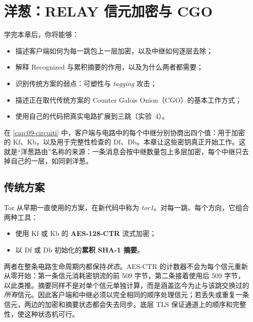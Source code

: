 \chapter{洋葱：RELAY 信元加密与 CGO}\label{cap:10-cifratura-relay}

\begin{obiettivi}
学完本章后，你将能够：
\begin{itemize}[nosep]
  \item 描述客户端如何为每一跳包上一层加密，以及中继如何逐层去除；
  \item 解释 Recognized 与累积摘要的作用，以及为什么两者都需要；
  \item 识别传统方案的弱点：可塑性与 \emph{tagging} 攻击；
  \item 描述正在取代传统方案的 Counter Galois Onion（CGO）的基本工作方式；
  \item 使用自己的代码把真实电路扩展到三跳（实验~4）。
\end{itemize}
\end{obiettivi}

在 \cref{cap:09-circuiti} 中，客户端与电路中的每个中继分别协商出四个值：用于加密的 Kf、Kb，以及用于完整性检查的 Df、Db。本章让这些密钥真正开始工作。这就是“洋葱路由”名称的来源：一条消息会按中继数量包上多层加密，每个中继只去掉自己的一层，如同剥洋葱。

\section{传统方案}\label{sec:tor1}

Tor 从早期一直使用的方案，在新代码中称为 \emph{tor1}。对每一跳、每个方向，它组合两种工具：
\begin{itemize}
  \item 使用 Kf 或 Kb 的 \textbf{AES-128-CTR} 流式加密；
  \item 以 Df 或 Db 初始化的\textbf{累积 SHA-1 摘要}。
\end{itemize}

两者在整条电路生命周期内都保持\emph{状态}。AES-CTR 的计数器不会为每个信元重新从零开始：第一条信元消耗密钥流的前 509 字节，第二条接着使用后 509 字节，以此类推。摘要同样不是对单个信元单独计算，而是涵盖迄今为止与该跳交换过的\emph{所有}信元。因此客户端和中继必须以完全相同的顺序处理信元；若丢失或重复一条信元，两边的加密和摘要状态都会失去同步。底层 TLS 保证通道上的顺序和完整性，使这种状态机可行。

